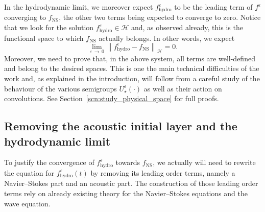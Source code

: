 \documentclass[10pt]{amsart}
\theoremstyle{definition}\newtheorem{defi}[theo]{Definition}\newtheorem{rema}[theo]{Remark}\newtheorem{exam}[theo]{Example}\newtheorem{exem}[theo]{Example}\newtheorem{nota}[theo]{Notation}
\newcommand{\ns}{\mathrm{NS}}
\newcommand{\hyd}{\mathrm{hydro}}
\newcommand{\HHH}{\mathscr{H}}
\newcommand{\SSSs}{\HHH}
\newcommand*\eps{{\varepsilon}}
\begin{document}
In the hydrodynamic limit, we moreover expect $f^\eps_\hyd$ to be the leading term of $f^\eps$ converging to $f_\ns$, the other two terms being expected to converge to zero. Notice that we look for the solution $f^\eps_\hyd \in \SSSs$ and, as observed already, this is the functional space to which $f_\ns$ actually belongs. In other words, we expect
\[
\lim_{\eps\,\to\,0}\left\| f_\hyd^\eps-f_\ns \right\|_{\SSSs}=0.
\]
Moreover, we need to prove that, in the above system, all terms are well-defined and belong to the desired spaces. This is one the main technical difficulties of the work and, as explained in the introduction, will follow from a careful study of the behaviour of the various semigroups $U^\eps_\star(\cdot)$ as well as their action on convolutions. See Section~\ref{scn:study_physical_space} for full proofs.


\subsection{Removing the acoustic initial layer and the hydrodynamic limit}



To justify the convergence of $f^\eps_\hyd$ towards $f_\ns$, we actually will need to rewrite the equation for $f^\eps_\hyd(t)$ by removing its leading order terms, namely a Navier--Stokes part and an acoustic part. The construction of those leading order terms rely on already existing theory for the Navier--Stokes equations and the wave equation.
\end{document}
